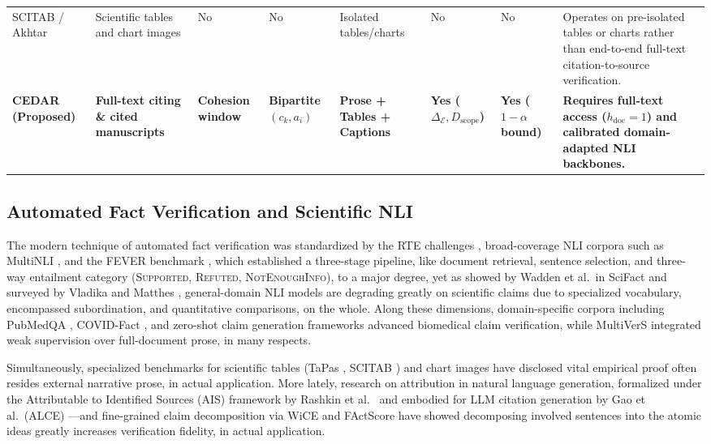 \documentclass[sigconf]{acmart}
\begin{document}
\begin{table}[t]
\begin{tabularx}{\textwidth}{L{2.6cm} L{2.2cm} C{1.4cm} C{1.5cm} C{1.5cm} C{1.5cm} C{1.4cm} Y}
SCITAB \cite{lu2023scitab} / Akhtar \cite{akhtar2023reading} & Scientific tables and chart images & No & No & Isolated tables/charts & No & No & Operates on pre-isolated tables or charts rather than end-to-end full-text citation-to-source verification. \\
\textbf{CEDAR (Proposed)} & \textbf{Full-text citing \& cited manuscripts} & \textbf{Cohesion window} & \textbf{Bipartite $(c_k, a_i)$} & \textbf{Prose + Tables + Captions} & \textbf{Yes ($\Delta_{\mathcal{E}}, D_{\text{scope}}$)} & \textbf{Yes ($1-\alpha$ bound)} & \textbf{Requires full-text access ($h_{\text{doc}}=1$) and calibrated domain-adapted NLI backbones.} \\
\bottomrule
\end{tabularx}
\end{table}

\subsection{Automated Fact Verification and Scientific NLI}
The modern technique of automated fact verification was standardized by the RTE challenges \cite{dagan2006pascal}, broad-coverage NLI corpora such as MultiNLI \cite{williams2018broad}, and the FEVER benchmark \cite{thorne2018fever,zeng2021automated}, which established a three-stage pipeline, like document retrieval, sentence selection, and three-way entailment category (\textsc{Supported}, \textsc{Refuted}, \textsc{NotEnoughInfo}), to a major degree, yet as showed by Wadden et al.\ in SciFact \cite{wadden2020fact} and surveyed by Vladika and Matthes \cite{vladika2023scientific}, general-domain NLI models are degrading greatly on scientific claims due to specialized vocabulary, encompassed subordination, and quantitative comparisons, on the whole. Along these dimensions, domain-specific corpora including PubMedQA \cite{jin2019pubmedqa}, COVID-Fact \cite{saakyan2021covidfact}, and zero-shot claim generation frameworks \cite{wright2022generating} advanced biomedical claim verification, while MultiVerS \cite{wadden2022multivers} integrated weak supervision over full-document prose, in many respects.

Simultaneously, specialized benchmarks for scientific tables (TaPas \cite{herzig2020tapas}, SCITAB \cite{lu2023scitab}) and chart images \cite{akhtar2023reading} have disclosed vital empirical proof often resides external narrative prose, in actual application. More lately, research on attribution in natural language generation, formalized under the Attributable to Identified Sources (AIS) framework by Rashkin et al.\ \cite{rashkin2023measuring} and embodied for LLM citation generation by Gao et al.\ (ALCE) \cite{gao2023enabling}---and fine-grained claim decomposition via WiCE \cite{kamoi2023wice} and FActScore \cite{min2023factscore} have showed decomposing involved sentences into the atomic ideas greatly increases verification fidelity, in actual application.
\end{document}
